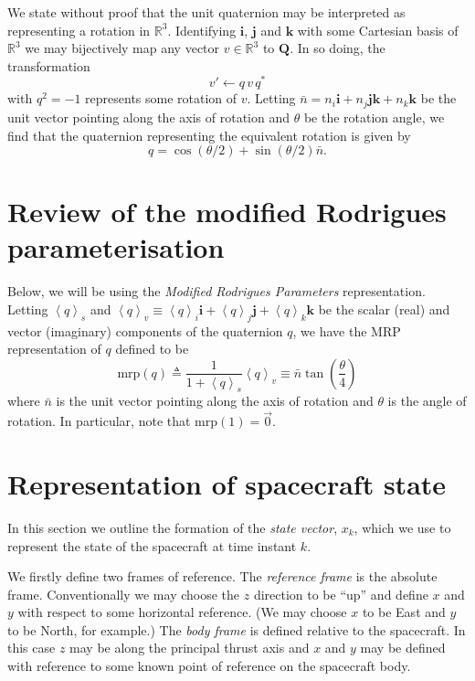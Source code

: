 \documentclass[a4paper]{paper}
\begin{document}
We state without proof that the unit quaternion may be interpreted as
representing a rotation in $\mathbb{R}^3$. Identifying $\mathbf{i}$,
$\mathbf{j}$ and $\mathbf{k}$ with some Cartesian basis of $\mathbb{R}^3$ we may
bijectively map any vector $v \in \mathbb{R}^3$ to $\mathbf{Q}$. In so doing,
the transformation
$$
v' \leftarrow q \, v \, q^*
$$
with $q^2 = -1$ represents some rotation of $v$. Letting $\bar{n} = n_i
\mathbf{i} + n_j \mathbf{jk} + n_k \mathbf{k}$ be the unit vector pointing along
the axis of rotation and $\theta$ be the rotation angle, we find that the
quaternion representing the equivalent rotation is given by
$$
q = \cos\left(\theta / 2\right) + \sin\left(\theta / 2\right) \bar{n}.
$$

\section{Review of the modified Rodrigues parameterisation}

Below, we will be using the \emph{Modified Rodrigues Parameters} representation.
Letting $\left< q\right>_s$ and $\left< q\right>_v \equiv \left< q \right>_i
\mathbf{i} + \left< q\right>_j \mathbf{j} + \left< q\right>_k \mathbf{k}$ be the
scalar (real) and vector (imaginary) components of the quaternion $q$, we have
the MRP representation of $q$ defined to be
$$
\mbox{mrp}(q) \triangleq \frac{1}{1 + \left< q\right>_s} \left< q
\right>_v \equiv \bar{n} \tan \left( \frac{\theta}{4} \right)
$$
where $\bar{n}$ is the unit vector pointing along the axis of rotation and
$\theta$ is the angle of rotation. In particular, note that $\mbox{mrp}(1) =
\vec{0}$.

\section{Representation of spacecraft state}

In this section we outline the formation of the \emph{state vector}, $x_k$,
which we use to represent the state of the spacecraft at time instant $k$.

We firstly define two frames of reference. The \emph{reference frame} is the
absolute frame. Conventionally we may choose the $z$ direction to be ``up'' and
define $x$ and $y$ with respect to some horizontal reference. (We may choose $x$
to be East and $y$ to be North, for example.) The \emph{body frame} is defined
relative to the spacecraft. In this case $z$ may be along the principal thrust
axis and $x$ and $y$ may be defined with reference to some known point of
reference on the spacecraft body.
\end{document}
